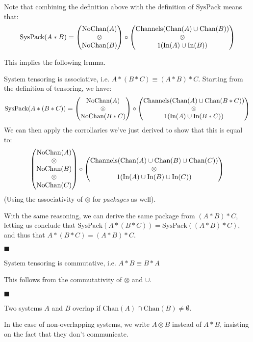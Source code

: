 Note that combining the definition above with the definition of $\text{SysPack}$
means that:
$$
\text{SysPack}(A * B) =
\begin{pmatrix}
\text{NoChan}(A)\cr
\otimes\cr
\text{NoChan}(B)\cr
\end{pmatrix}
\circ
\begin{pmatrix}
\text{Channels}(\text{Chan}(A) \cup \text{Chan}(B))\cr
\otimes\cr
1(\text{In}(A) \cup \text{In}(B))\cr
\end{pmatrix}
$$

This implies the following lemma.

\begin{lemma}
System tensoring is associative, i.e. $A * (B * C) \equiv (A * B) * C$.
 Starting from the definition of tensoring, we have:
$$
\text{SysPack}(A * (B * C)) =
\begin{pmatrix}
\text{NoChan}(A)\cr
\otimes\cr
\text{NoChan}(B * C)\cr
\end{pmatrix}
\circ
\begin{pmatrix}
\text{Channels}(\text{Chan}(A) \cup \text{Chan}(B * C))\cr
\otimes\cr
1(\text{In}(A) \cup \text{In}(B * C))\cr
\end{pmatrix}
$$
We can then apply the corrollaries we've just derived to show that this
is equal to:
$$
\begin{pmatrix}
\text{NoChan}(A)\cr
\otimes\cr
\text{NoChan}(B)\cr
\otimes\cr
\text{NoChan}(C)\cr
\end{pmatrix}
\circ
\begin{pmatrix}
  \text{Channels}(\text{Chan}(A) \cup \text{Chan}(B) \cup \text{Chan}(C))\cr
\otimes\cr
  1(\text{In}(A) \cup \text{In}(B) \cup \text{In}(C))\cr
\end{pmatrix}
$$
(Using the associativity of $\otimes$ for \emph{packages} as well).

With the same reasoning, we can derive the same package from $(A * B) * C$,
letting us conclude that $\text{SysPack}(A * (B * C)) = \text{SysPack}((A * B) * C)$,
and thus that $A * (B * C) = (A * B) * C$.

$\blacksquare$
\end{lemma}

\begin{lemma}
System tensoring is commutative, i.e. $A * B \equiv B * A$

 This follows from the commutativity of $\otimes$ and $\cup$.

$\blacksquare$
\end{lemma}

\begin{definition}
Two systems $A$ and $B$ overlap if $\text{Chan}(A) \cap \text{Chan}(B) \neq \emptyset$.

In the case of non-overlapping systems, we write $A \otimes B$ instead of $A * B$,
insisting on the fact that they don't communicate.
\end{definition}

